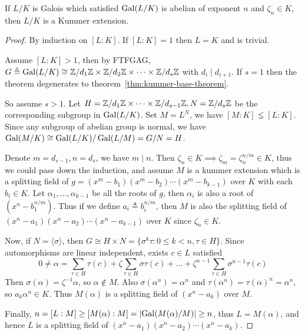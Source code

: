 \begin{theorem}
  If $L/K$ is Galois which satisfied $\operatorname{Gal}(L/K)$ is abelian of exponent $n$ and $\zeta_n \in K$,
  then $L/K$ is a Kummer extension.

  \begin{proof}
    By induction on $[L: K]$. If $[L: K] = 1$ then $L = K$ and is trivial.

    Assume $[L: K] > 1$, then by FTFGAG, $G \triangleq \operatorname{Gal}(L/K) \cong {\mathbb{Z}}/{d_1 \mathbb{Z}}
    \times {\mathbb{Z}}/{d_2 \mathbb{Z}} \times \dots \times {\mathbb{Z}}/{d_s \mathbb{Z}}$ with $d_i \mid d_{i+1}$.
    If $s = 1$ then the theorem degenerates to theorem~\ref{thm:kummer-base-theorem}.

    So assume $s > 1$. Let $H = \mathbb{Z} / d_1 \mathbb{Z} \times \dots \times \mathbb{Z} / d_{s-1} \mathbb{Z},
    N = \mathbb{Z} / d_s \mathbb{Z}$ be the corresponding subgroup in $\operatorname{Gal}(L/K)$.
    Set $M = L^N$, we have $[M: K] \lneq [L: K]$. Since any subgroup
    of abelian group is normal, we have $\operatorname{Gal}(M/K) \cong \operatorname{Gal}(L/K) / \operatorname{Gal}(L/M) = G / N = H$.

    Denote $m = d_{s-1}, n = d_{s}$, we have $m \mid n$. Then $\zeta_n \in K \implies \zeta_m = \zeta_n^{n/m} \in K$,
    thus we could pass down the induction, and assume $M$ is a kummer extension which is a splitting
    field of $g = (x^m - b_1) (x^m - b_2) \dotsm (x^m - b_{k-1})$ over $K$ with each $b_i \in K$.
    Let $\alpha_1, \dots, \alpha_{k-1}$ be all the roots of $g$, then $\alpha_i$
    is also a root of $(x^n - b_1^{n/m})$. Thus if we define $a_i \triangleq b_i^{n/m}$, then
    $M$ is also the splitting field of $(x^n - a_1) (x^n - a_2) \dotsm (x^n - a_{k-1})$ over $K$
    since $\zeta_n \in K$.

    Now, if $N = \langle \sigma \rangle$, then $G \cong H \times N = \{\sigma^k \tau : 0 \leq k < n, \tau \in H\}$.
    Since automorphisms are linear independent, exists $c \in L$ satisfied
    \[ 0 \neq \alpha = \sum_{\tau \in H} \tau(c) + \zeta \sum_{\tau \in H} \sigma \tau(c)
    + \dots + \zeta^{n-1} \sum_{\tau \in H} \sigma^{n-1} \tau(c) \]
  Then $\sigma(\alpha) = \zeta^{-1} \alpha$, so $\alpha \not\in M$. Also $\sigma(\alpha^n) = \alpha^n$
  and $\tau(\alpha^n) = \tau(\alpha)^n = \alpha^n$, so $a_k \alpha^n \in K$.
  Thus $M(\alpha)$ is a splitting field of $(x^n - a_k)$ over $M$.

  Finally, $n = [L: M] \geq [M(\alpha): M] = \lvert\operatorname{Gal}(M(\alpha) / M)\rvert \geq n$,
  thus $L = M(\alpha)$, and hence $L$ is a splitting field of
  $(x^n - a_1) (x^n - a_2) \dotsm (x^n - a_k)$.
  \end{proof}
\end{theorem}

